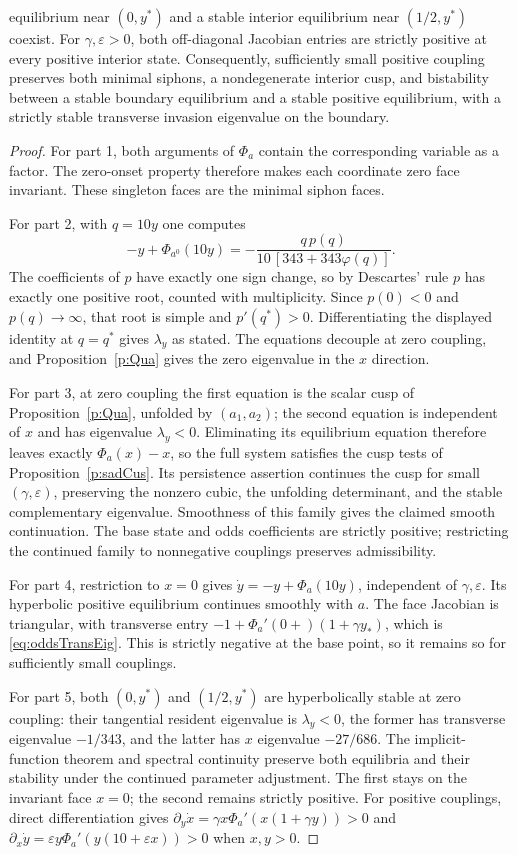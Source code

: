  equilibrium near $(0,y^*)$ and a stable interior equilibrium
 near $(1/2,y^*)$ coexist. For $\gamma,\varepsilon>0$, both off-diagonal Jacobian entries
 are strictly positive at every positive interior state.
\EEN
Consequently, sufficiently small positive coupling preserves
both minimal siphons, a nondegenerate interior cusp, and bistability
between a stable boundary equilibrium and a stable positive equilibrium,
with a strictly stable transverse invasion eigenvalue on the boundary.
\eeT
\begin{proof}
For part 1, both arguments of $\Phi_a$ contain the corresponding
variable as a factor. The zero-onset property therefore makes each
coordinate zero face invariant. These singleton faces are the
minimal siphon faces.

For part 2, with $q=10y$ one computes
\[
 -y+\Phi_{a^0}(10y)
 =-\frac{q\,p(q)}{10\,[343+343\varphi(q)]}.
\]
The coefficients of $p$ have exactly one sign change, so by
Descartes' rule $p$ has exactly one positive root, counted with
multiplicity. Since $p(0)<0$ and $p(q)\to\infty$, that root is
simple and $p'(q^*)>0$. Differentiating the displayed identity at
$q=q^*$ gives $\lambda_y$ as stated. The equations decouple at
zero coupling, and Proposition~\ref{p:Qua} gives the zero eigenvalue
in the $x$ direction.

For part 3, at zero coupling the first equation is the scalar
cusp of Proposition~\ref{p:Qua}, unfolded by $(a_1,a_2)$; the
second equation is independent of $x$ and has eigenvalue
$\lambda_y<0$. Eliminating its equilibrium equation therefore
leaves exactly $\Phi_a(x)-x$, so the full system satisfies the cusp
tests of Proposition~\ref{p:sadCus}. Its persistence assertion
continues the cusp for small $(\gamma,\varepsilon)$, preserving
the nonzero cubic, the unfolding determinant, and the stable
complementary eigenvalue. Smoothness of this family gives the
claimed smooth continuation. The base state and odds coefficients
are strictly positive; restricting the continued family to
nonnegative couplings preserves admissibility.

For part 4, restriction to $x=0$ gives
$\dot y=-y+\Phi_a(10y)$, independent of $\gamma,\varepsilon$.
Its hyperbolic positive equilibrium continues smoothly with $a$.
The face Jacobian is triangular, with transverse entry
$-1+\Phi_a'(0+)(1+\gamma y_*)$, which is
\eqref{eq:oddsTransEig}. This is strictly negative at the base
point, so it remains so for sufficiently small couplings.

For part 5, both $(0,y^*)$ and $(1/2,y^*)$ are hyperbolically
stable at zero coupling: their tangential resident eigenvalue is
$\lambda_y<0$, the former has transverse eigenvalue $-1/343$,
and the latter has $x$ eigenvalue $-27/686$. The implicit-function
theorem and spectral continuity preserve both equilibria and their
stability under the continued parameter adjustment. The first stays
on the invariant face $x=0$; the second remains strictly positive.
For positive couplings, direct differentiation gives
$\partial_y\dot x=\gamma x\Phi_a'(x(1+\gamma y))>0$
and
$\partial_x\dot y=\varepsilon y\Phi_a'(y(10+\varepsilon x))>0$
when $x,y>0$.
\end{proof}

